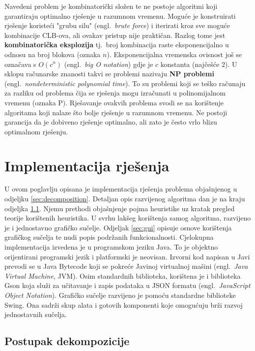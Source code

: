\documentclass[times, utf8, diplomski]{fer}
\begin{document}
Navedeni problem je kombinatorički složen te ne postoje algoritmi koji garantiraju optimalno rješenje u razumnom vremenu. Moguće je konstruirati rješenje koristeći "grubu silu" (engl.~\textit{brute force}) i iterirati kroz sve moguće kombinacije CLB-ova, ali ovakav pristup nije praktičan. Razlog tome jest \textbf{kombinatorička eksplozija} tj.~broj kombinacija raste eksponencijalno u odnosu na broj blokova (oznaka $n$). Eksponencijalna vremenska ovisnost još se označava s $O(c^{n})$ (engl.~\textit{big O notation}) gdje je $c$ konstanta (najčešće $2$). U sklopu računarske znanosti takvi se problemi nazivaju \textbf{NP problemi} (engl.~\textit{nondeterministic polynomial time}). To su problemi koji se teško računaju za razliku od problema čija se rješenja mogu izračunati u polinomijalnom vremenu (oznaka P). Rješavanje ovakvih problema svodi se na korištenje algoritama koji nalaze što bolje rješenje u razumnom vremenu. Ne postoji garancija da je dobiveno rješenje optimalno, ali zato je često vrlo blizu optimalnom rješenju.


\chapter{Implementacija rješenja} \label{chapter:impl}

U ovom poglavlju opisana je implementacija rješenja problema objašnjenog u odjeljku \ref{sec:decomposition}. Detaljan opis razvijenog algoritma dan je na kraju odjeljka \ref{sec:impl_decomp}. Njemu prethodi objašnjenje pojma heuristike uz kratak pregled teorije korištenih heuristika. U svrhu lakšeg korištenja samog algoritma, razvijeno je i jednostavno grafičko sučelje. Odjeljak \ref{sec:gui} opisuje osnove korištenja grafičkog sučelja te nudi popis podržanih funkcionalnosti. Cjelokupna implementacija izvedena je u programskom jeziku Java. To je objektno orijentirani programski jezik i platformski je neovisan. Izvorni kod napisan u Javi prevodi se u Java Bytecode koji se pokreće Javinoj virtualnoj mašini (engl.~\textit{Java Virtual Machine}, JVM). Osim standardnih biblioteka, korištena je i biblioteka Gson koja služi za učitavanje i zapis podataka u JSON formatu (engl.~\textit{JavaScript Object Notation}). Grafičko sučelje razvijeno je pomoću standardne biblioteke Swing. Ona sadrži skup alata i gotovih komponenti koje omogućuju brži razvoj jednostavnih sučelja.


\section{Postupak dekompozicije} \label{sec:impl_decomp}
\end{document}
